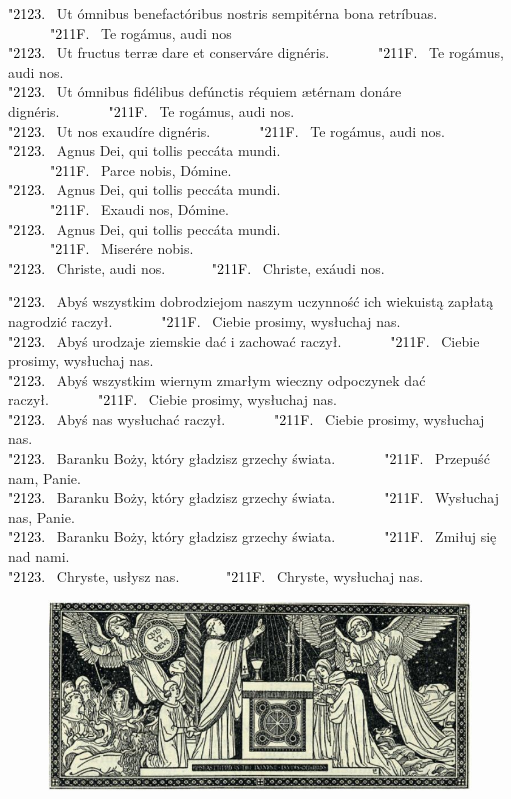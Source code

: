 \documentclass[10pt,a5paper]{book}
\newcommand{\kol}{black}
\newcommand{\textjuni}[1]{{\fontspec{Junicode-Regular}#1}}
\newcommand{\vv}{\textcolor{\kol}{\textjuni{\char"2123. }}}
\newcommand{\rrr}{\newline\textcolor{\kol}{\textjuni{~~~~~~\char"211F. }}}
\newcommand{\oremuss}[2]{
	\begin{sloppypar}
		\begin{paracol}{2}
			\setlength{\columnsep}{0em}
			\begin{leftcolumn}
				#1
			\end{leftcolumn}
			\begin{rightcolumn}
				#2
			\end{rightcolumn}
		\end{paracol}
	\end{sloppypar}}
\begin{document}
						\oremuss{
							\vv Ut ómnibus benefactóribus nostris sempitérna bona retríbuas. \\ \rrr Te rogámus, audi nos\\
							\vv Ut fructus terræ dare et conserváre dignéris. \rrr Te rogámus, audi nos.\\
							\vv Ut ómnibus fidélibus defúnctis réquiem ætérnam donáre dignéris. \rrr Te rogámus, audi nos.\\
							\vv Ut nos exaudíre dignéris. \rrr Te rogámus, audi nos.\\
							\vv Agnus Dei, qui tollis peccáta mundi. \\ \rrr Parce nobis, Dómine.\\
							\vv Agnus Dei, qui tollis peccáta mundi. \\ \rrr Exaudi nos, Dómine.\\
							\vv Agnus Dei, qui tollis peccáta mundi. \\ \rrr Miserére nobis.\\
							\vv Christe, audi nos. \rrr Christe, exáudi nos.}{
							\vv Abyś wszystkim dobrodziejom naszym uczynność ich wiekuistą zapłatą nagrodzić raczył. \rrr Ciebie prosimy, wysłuchaj nas.\\
							\vv Abyś urodzaje ziemskie dać i zachować raczył. \rrr Ciebie prosimy, wysłuchaj nas.\\
							\vv Abyś wszystkim wiernym zmarłym wieczny odpoczynek dać raczył. \rrr Ciebie prosimy, wysłuchaj nas.\\
							\vv Abyś nas wysłuchać raczył. \rrr Ciebie prosimy, wysłuchaj nas.\\
							\vv Baranku Boży, który gładzisz grzechy świata. \rrr Przepuść nam, Panie.\\
							\vv Baranku Boży, który gładzisz grzechy świata. \rrr Wysłuchaj nas, Panie.\\
							\vv Baranku Boży, który gładzisz grzechy świata. \rrr Zmiłuj się nad nami.\\
							\vv Chryste, usłysz nas. \rrr Chryste, wysłuchaj nas.}
						
						\vfill 
						
						\centerline{}
						
						\vfill
						
				\newpage
						
				\begin{figure}[h]
					\centering
					\includegraphics[width=\linewidth]{3.jpg}
				\end{figure}
						
\end{document}
